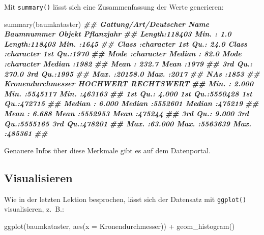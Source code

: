 \documentclass[11pt,german,a4paper]{article}
\newenvironment{Shaded}{\begin{snugshade}}{\end{snugshade}}
\newcommand{\AttributeTok}[1]{\textcolor[rgb]{0.77,0.63,0.00}{#1}}
\newcommand{\DocumentationTok}[1]{\textcolor[rgb]{0.56,0.35,0.01}{\textbf{\textit{#1}}}}
\newcommand{\FunctionTok}[1]{\textcolor[rgb]{0.00,0.00,0.00}{#1}}
\newcommand{\NormalTok}[1]{#1}
\newcommand{\SpecialCharTok}[1]{\textcolor[rgb]{0.00,0.00,0.00}{#1}}
\begin{document}
Mit \texttt{summary()} lässt sich eine Zusammenfassung der Werte generieren:

\begin{Shaded}
\begin{Highlighting}[]
\FunctionTok{summary}\NormalTok{(baumkataster)}
\DocumentationTok{\#\#  Gattung/Art/Deutscher Name   Baumnummer         Objekt            Pflanzjahr  }
\DocumentationTok{\#\#  Length:118403              Min.   :    1.0   Length:118403      Min.   :1645  }
\DocumentationTok{\#\#  Class :character           1st Qu.:   24.0   Class :character   1st Qu.:1970  }
\DocumentationTok{\#\#  Mode  :character           Median :   82.0   Mode  :character   Median :1982  }
\DocumentationTok{\#\#                             Mean   :  232.7                      Mean   :1979  }
\DocumentationTok{\#\#                             3rd Qu.:  270.0                      3rd Qu.:1995  }
\DocumentationTok{\#\#                             Max.   :20158.0                      Max.   :2017  }
\DocumentationTok{\#\#                             NA\textquotesingle{}s   :1853                                       }
\DocumentationTok{\#\#  Kronendurchmesser    HOCHWERT         RECHTSWERT    }
\DocumentationTok{\#\#  Min.   : 2.000    Min.   :5545117   Min.   :463163  }
\DocumentationTok{\#\#  1st Qu.: 4.000    1st Qu.:5550428   1st Qu.:472715  }
\DocumentationTok{\#\#  Median : 6.000    Median :5552601   Median :475219  }
\DocumentationTok{\#\#  Mean   : 6.688    Mean   :5552953   Mean   :475244  }
\DocumentationTok{\#\#  3rd Qu.: 9.000    3rd Qu.:5555165   3rd Qu.:478201  }
\DocumentationTok{\#\#  Max.   :63.000    Max.   :5563639   Max.   :485361  }
\DocumentationTok{\#\# }
\end{Highlighting}
\end{Shaded}

Genauere Infos über diese Merkmale gibt es auf dem Datenportal.

\hypertarget{visualisieren}{%
\subsection{Visualisieren}\label{visualisieren}}

Wie in der letzten Lektion besprochen, lässt sich der Datensatz mit \texttt{ggplot()} visualisieren, z.~B.:

\begin{Shaded}
\begin{Highlighting}[]
\FunctionTok{ggplot}\NormalTok{(baumkataster, }\FunctionTok{aes}\NormalTok{(}\AttributeTok{x =}\NormalTok{ Kronendurchmesser)) }\SpecialCharTok{+}
  \FunctionTok{geom\_histogram}\NormalTok{()}
\end{Highlighting}
\end{Shaded}
\end{document}
